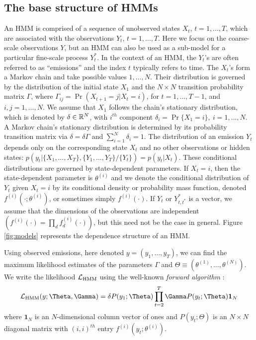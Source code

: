 \subsection{The base structure of HMMs}

An HMM is comprised of a sequence of unobserved states $X_t$, $t = 1, \ldots, T$, which are associated with the observations $Y_t$, $t = 1, \ldots, T$. Here we focus on the coarse-scale observations $Y$, but an HMM can also be used as a sub-model for a particular fine-scale process $Y_t^*$. In the context of an HMM, the $Y_t$'s are often referred to as ``emissions'' and the index $t$ typically refers to time. 
The $X_t$'s form a Markov chain and take possible values $1, \ldots, N$. Their distribution is governed by the distribution of the initial state $X_1$ and the $N \times N$ transition probability matrix $\Gamma$, where $\Gamma_{ij} = \Pr(X_{t+1} = j | X_t = i)$, for $t=1,\ldots, T-1$, and $i, j = 1,\ldots, N$. 
%
We assume that $X_1$ follows the chain's stationary distribution, which is denoted by $\delta \in \mathbb{R}^N$, with $i^{th}$ component
$\delta_i = \Pr\{X_1 = i\},~ i = 1,\ldots,N.$
A Markov chain's stationary distribution is determined by its probability transition matrix via $\delta = \delta \Gamma$ and $\sum_{i=1}^N \delta_i = 1$.
%
The distribution of an emission $Y_t$ depends only on the corresponding state $X_t$ and no other observations or hidden states: $p\left(y_t|\{X_1,\ldots, X_T\},\{Y_1,\ldots, Y_T\}/ \{Y_t\}\right) = p(y_t|X_t)$.
%
These conditional distributions are governed by state-dependent parameters. If $X_t = i$, then the state-dependent parameter is $\theta^{(i)}$ and we denote the conditional distribution of $Y_t$ given $X_t=i$ by its conditional density or probability mass function, denoted $f^{(i)}(\cdot ; \theta^{(i)})$, or sometimes simply $f^{(i)}(\cdot)$. If $Y_t$ or $Y^*_{t,t^*}$ is a vector, we assume that the dimensions of the observations are independent $\left(f^{(i)}(\cdot) = \prod_{d} f^{(i)}_d(\cdot)\right)$, but this need not be the case in general.
%
Figure \ref{fig:models} represents the dependence structure of an HMM.

Using observed emissions, here denoted $y = (y_1,\ldots,y_T)$, we can find the maximum likelihood estimates of the parameters $\Gamma$ and $\Theta \equiv (\theta^{(1)},\ldots,\theta^{(N)})$. We write the likelihood $\mathcal{L}_{\text{HMM}}$ using the  well-known \textit{forward algorithm} \citep{Zucchini:2016}:
%
$$\calL_{\text{HMM}}(y;\Theta,\Gamma) = \delta P(y_1;\Theta) \prod_{t=2}^T \Gamma P(y_t;\Theta) \mathbf{1}_N$$
%
where $\mathbf{1}_N$ is an $N$-dimensional column vector of ones and
%
$P(y_t;\Theta)$ is an $N \times N$ diagonal matrix with $(i,i)^{th}$ entry  $f^{(i)}(y_t; \theta^{(i)})$.
%

